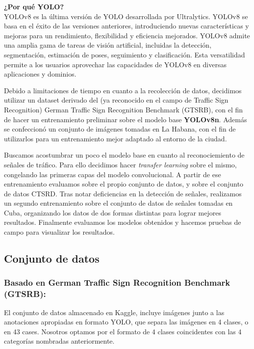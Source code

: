 \documentclass{article}
\begin{document}
\begin{tcolorbox}
\textbf{¿Por qué YOLO?}\\
YOLOv8 es la última versión de YOLO desarrollada por Ultralytics. YOLOv8 se basa en el éxito de las versiones anteriores, introduciendo nuevas características y mejoras para un rendimiento, flexibilidad y eficiencia mejorados. YOLOv8 admite una amplia gama de tareas de visión artificial, incluidas la detección, segmentación, estimación de poses, seguimiento y clasificación. Esta versatilidad permite a los usuarios aprovechar las capacidades de YOLOv8 en diversas aplicaciones y dominios.
\end{tcolorbox}

Debido a limitaciones de tiempo en cuanto a la recolección de datos, decidimos utilizar un dataset derivado del (ya reconocido en el campo de Traffic Sign Recognition) German Traffic Sign Recognition Benchmark (GTSRB), con el fin de hacer un entrenamiento preliminar sobre el modelo base \textbf{YOLOv8n}. Además se confeccionó un conjunto de imágenes tomadas en La Habana, con el fin de utilizarlos para un entrenamiento mejor adaptado al entorno de la ciudad.

Buscamos acostumbrar un poco el modelo base en cuanto al reconociemiento de señales de tráfico. Para ello decidimos hacer \textit{transfer learning} sobre el mismo, congelando las primeras capas del modelo convolucional. A partir de ese entrenamiento evaluamos sobre el propio conjunto de datos, y sobre el conjunto de datos CTSRD. Tras notar deficiencias en la detección de señales, realizamos un segundo entrenamiento sobre el conjunto de datos de señales tomadas en Cuba, organizando los datos de dos formas distintas para lograr mejores resultados. Finalmente evaluamos los modelos obtenidos y hacemos pruebas de campo para visualizar los resultados. 



\subsection{Conjunto de datos}
\subsubsection{Basado en German Traffic Sign Recognition Benchmark (GTSRB):}
El conjunto de datos almacenado en Kaggle, incluye imágenes junto a las anotaciones apropiadas en formato YOLO, que separa las imágenes en 4 clases, o en 43 cases. Nosotros optamos por el formato de 4 clases coincidentes con las 4 categorías nombradas anteriormente.
\end{document}
